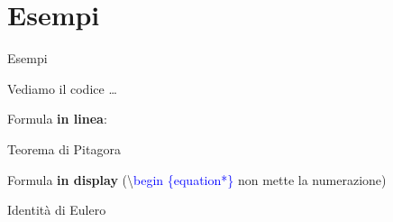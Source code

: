 \section{Esempi}
  \begin{frame}{Esempi}

    Vediamo il codice \dots

    Formula \textbf{in linea}:

    \begin{exampleblock}{Teorema di Pitagora}
      
    \end{exampleblock}

    Formula \textbf{in display} (\textbackslash \textcolor{blue}{begin \{equation*\}} non mette la numerazione)

    \begin{exampleblock}{Identità di Eulero}
      
    \end{exampleblock}

\end{frame}

